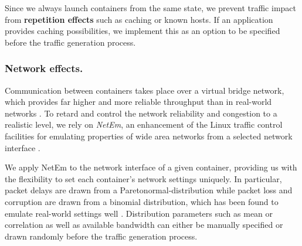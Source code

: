 \documentclass[runningheads]{llncs}
\begin{document}
Since we always launch containers from the same state, we prevent traffic impact from \textbf{repetition effects} such as caching or known hosts. If an application provides caching possibilities, we implement this as an option to be specified before the traffic generation process.


\subsubsection*{Network effects.}




Communication between containers takes place over a virtual bridge network, which provides far higher and more reliable throughput than in real-world networks \cite{iperf}. To retard and control the network reliability and congestion to a realistic level, we rely on \emph{NetEm}, an enhancement of the Linux traffic control facilities for emulating properties of wide area networks from a selected network interface \cite{hemminger2005network}.


We apply NetEm to the network interface of a given container, providing us with the flexibility to set each container's network settings uniquely. In particular, packet delays are drawn from a Paretonormal-distribution while packet loss and corruption are drawn from a binomial distribution, which has been found to emulate real-world settings well \cite{jurgelionis2011empirical}. Distribution parameters such as mean or correlation as well as available bandwidth can either be manually specified or drawn randomly before the traffic generation process.
\end{document}
